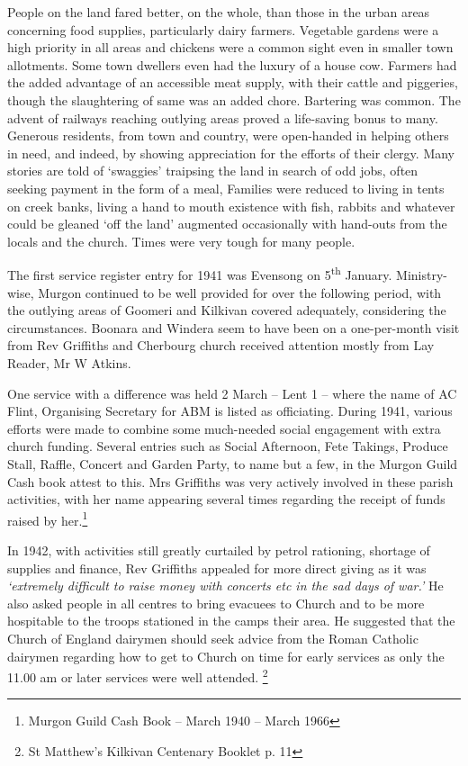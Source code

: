 People on the land fared better, on the whole, than those in the urban areas concerning food supplies, particularly dairy farmers. Vegetable gardens were a high priority in all areas and chickens were a common sight even in smaller town allotments. Some town dwellers even had the luxury of a house cow. Farmers had the added advantage of an accessible meat supply, with their cattle and piggeries, though the slaughtering of same was an added chore. Bartering was common. The advent of railways reaching outlying areas proved a life-saving bonus to many. Generous residents, from town and country, were open-handed in helping others in need, and indeed, by showing appreciation for the efforts of their clergy. Many stories are told of `swaggies' traipsing the land in search of odd jobs, often seeking payment in the form of a meal, Families were reduced to living in tents on creek banks, living a hand to mouth existence with fish, rabbits and whatever could be gleaned `off the land' augmented occasionally with hand-outs from the locals and the church. Times were very tough for many people.



The first service register entry for 1941 was Evensong on 5\textsuperscript{th} January. Ministry-wise, Murgon continued to be well provided for over the following period, with the outlying areas of Goomeri and Kilkivan covered adequately, considering the circumstances. Boonara and Windera seem to have been on a one-per-month visit from Rev Griffiths and Cherbourg church received attention mostly from Lay Reader, Mr W Atkins.



One service with a difference was held 2 March -- Lent 1 -- where the name of AC Flint, Organising Secretary for ABM is listed as officiating. During 1941, various efforts were made to combine some much-needed social engagement with extra church funding. Several entries such as Social Afternoon, Fete Takings, Produce Stall, Raffle, Concert and Garden Party, to name but a few, in the Murgon Guild Cash book attest to this. Mrs Griffiths was very actively involved in these parish activities, with her name appearing several times regarding the receipt of funds raised by her.\footnote{Murgon Guild Cash Book -- March 1940 -- March 1966}


In 1942, with activities still greatly curtailed by petrol rationing, shortage of supplies and finance, Rev Griffiths appealed for more direct giving as it was \emph{`extremely difficult to raise money with concerts etc in the sad days of war.'} He also asked people in all centres to bring evacuees to Church and to be more hospitable to the troops stationed in the camps their area. He suggested that the Church of England dairymen should seek advice from the Roman Catholic dairymen regarding how to get to Church on time for early services as only the 11.00 am or later services were well attended. \footnote{St Matthew's Kilkivan Centenary Booklet p. 11}


